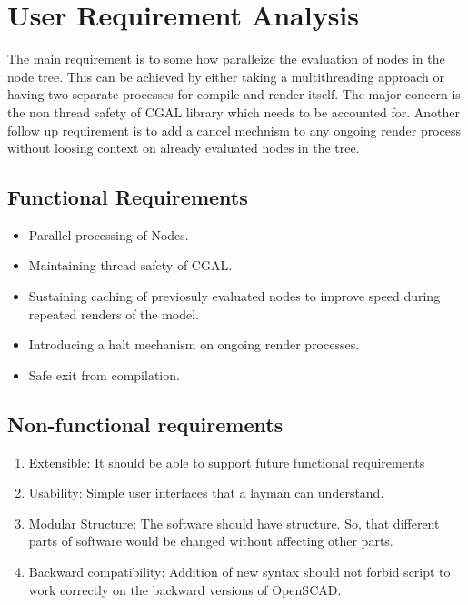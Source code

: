 \section{User Requirement Analysis}
The main requirement is to some how paralleize the evaluation of nodes in the node tree. This can be achieved by either taking a multithreading approach or having two separate processes for compile and render itself. The major concern is the non thread safety of CGAL library which needs to be accounted for.
Another follow up requirement is to add a cancel mechnism to any ongoing render process without loosing context on already evaluated nodes in the tree.

\subsection{Functional Requirements}
\begin{itemize}
	\item Parallel processing of Nodes.
	\item Maintaining thread safety of CGAL.
	\item Sustaining caching of previosuly evaluated nodes to improve speed during repeated renders of the model.
	\item Introducing a halt mechanism on ongoing render processes.
	\item Safe exit from compilation.
\end{itemize}

\subsection{Non-functional requirements}
\begin{enumerate}
	\item Extensible: It should be able to support future functional requirements
	\item Usability: Simple user interfaces that a layman can understand.
	\item Modular Structure: The software should have  structure. So, that different parts of software would be changed without affecting other parts.
	\item Backward compatibility: Addition of new syntax should not forbid script to work correctly on the backward versions of OpenSCAD.
\end{enumerate}

